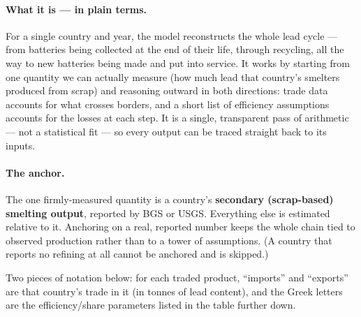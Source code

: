 \documentclass[11pt,a4paper]{article}
\begin{document}
\paragraph{What it is --- in plain terms.} For a single country and year, the model
reconstructs the whole lead cycle --- from batteries being collected at the end of
their life, through recycling, all the way to new batteries being made and put into
service. It works by starting from one quantity we can actually measure (how much
lead that country's smelters produced from scrap) and reasoning outward in both
directions: trade data accounts for what crosses borders, and a short list of
efficiency assumptions accounts for the losses at each step. It is a single,
transparent pass of arithmetic --- not a statistical fit --- so every output can be
traced straight back to its inputs.

\paragraph{The anchor.} The one firmly-measured quantity is a country's
\textbf{secondary (scrap-based) smelting output}, reported by BGS or USGS.
Everything else is estimated relative to it. Anchoring on a real, reported number
keeps the whole chain tied to observed production rather than to a tower of
assumptions. (A country that reports no refining at all cannot be anchored and is
skipped.)

Two pieces of notation below: for each traded product, ``imports'' and ``exports''
are that country's trade in it (in tonnes of lead content), and the Greek letters
are the efficiency/share parameters listed in the table further down.
\end{document}
